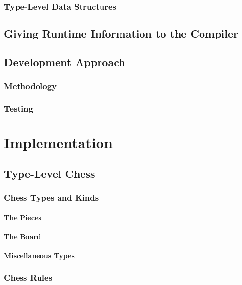 \documentclass[12pt, a4paper, bibliography=totocnumbered]{scrreprt}
\begin{document}
\section{Type-Level Data Structures}

\chapter{Giving Runtime Information to the Compiler}

\chapter{Development Approach}

\section{Methodology}

\section{Testing}


\part{Implementation}

\chapter{Type-Level Chess}

\section{Chess Types and Kinds}

\subsection{The Pieces}

\subsection{The Board}

\subsection{Miscellaneous Types}

\section{Chess Rules}
\end{document}
